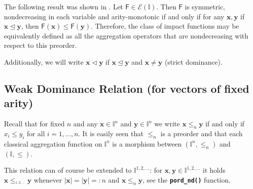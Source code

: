 \documentclass[11pt]{article}\usepackage[]{graphicx}\usepackage[]{color}
\newcommand{\hlkwd}[1]{\textcolor[rgb]{0.737,0.353,0.396}{\textbf{#1}}}%
\newcommand{\Rfunc}[1]{\texttt{\hlkwd{#1}}}
\newcommand{\vect}[1]{{\mathbf{#1}}}
\newcommand{\func}[1]{{\mathsf{#1}}}
\newcommand{\Ival}{\mathbb{I}}
\newcommand{\IvalPow}[1]{\mathbb{I}^{#1}}
\newcommand{\AnyPow}{^{1,2,\dots}}
\newcommand{\IvalAnyPow}{\mathbb{I}\AnyPow}
\theoremstyle{remark}
\theoremstyle{definition}
\begin{document}
The following result was shown in \cite{GagolewskiGrzegorzewski2011:ijar}.
Let $\func{F}\in \mathcal{E}(\Ival)$. Then $\func{F}$
is symmetric, nondecreasing in each variable
and arity-monotonic if and only if for any $\vect{x},\vect{y}$
if $\vect{x}\trianglelefteq\vect{y}$, then
$\func{F}(\vect{x})\le \func{F}(\vect{y})$.
Therefore, the class of  impact functions may be equivalently
defined as all the aggregation operators
that are nondecreasing with respect to this preorder.


Additionally, we will write $\vect{x}\vartriangleleft\vect{y}$ if
$\vect{x}\trianglelefteq\vect{y}$ and $\vect{x}\neq\vect{y}$
(strict dominance).


\subsection{Weak Dominance Relation (for vectors of fixed arity)}

Recall that for fixed $n$ and any $\vect{x}\in\IvalPow{n}$ and $\vect{y}\in\IvalPow{n}$
we write
$\vect{x}\le_n\vect{y}$ if and only if
$x_{i}\le y_{i}$ for all $i=1,\dots,n$.
It is easily seen that $\le_n$ is a preorder
and that each classical aggregation function on $\IvalPow{n}$
is a morphism between $(\IvalPow{n}, \le_n)$ and $(\Ival, \le)$.

This relation can of course be extended to $\IvalAnyPow$:
for $\vect{x},\vect{y}\in\IvalAnyPow$ it holds
$\vect{x}\le_{\AnyPow}\vect{y}$ whenever $|\vect{x}|=|\vect{y}|=:n$
and $\vect{x}\le_n\vect{y}$, see the \index{\Rfunc{pord\_nd()}}\Rfunc{pord\_nd()}
function.
\end{document}
